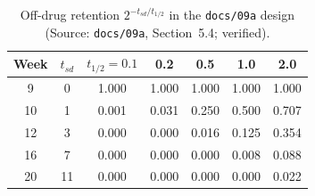 \documentclass[11pt]{article}
\newcommand{\code}[1]{\texttt{#1}}
\begin{document}
\begin{table}[h]
\centering\small
\caption{Off-drug retention $2^{-t_{sd}/t_{1/2}}$ in the
\code{docs/09a} design (Source: \code{docs/09a}, Section~5.4;
verified).}
\label{tab:inva-retention}
\begin{tabular}{@{}ccccccc@{}}
\toprule
Week & $t_{sd}$ & $t_{1/2} = 0.1$ & 0.2 & 0.5 & 1.0 & 2.0 \\
\midrule
9  & 0  & 1.000 & 1.000 & 1.000 & 1.000 & 1.000 \\
10 & 1  & 0.001 & 0.031 & 0.250 & 0.500 & 0.707 \\
12 & 3  & 0.000 & 0.000 & 0.016 & 0.125 & 0.354 \\
16 & 7  & 0.000 & 0.000 & 0.000 & 0.008 & 0.088 \\
20 & 11 & 0.000 & 0.000 & 0.000 & 0.000 & 0.022 \\
\bottomrule
\end{tabular}
\end{table}
\end{document}
